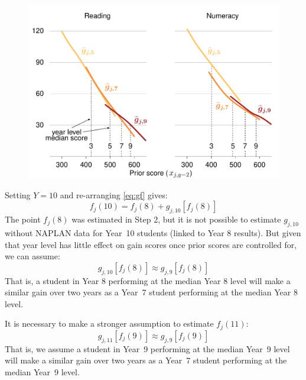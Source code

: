 \begin{figure}[t]
 \includegraphics[width=\columnwidth]{atlas/G579.pdf}\label{fig:g579}

\end{figure}

Setting $Y=10$ and re-arranging \cref{eq:gf} gives:
\begin{equation}
f_{j}\left(10\right) = f_{j}\left(8\right) + g_{j,10}\left[f_{j}\left(8\right)\right]
\end{equation}
The point $f_{j}\left(8\right)$ was estimated in Step 2, but it is not possible to estimate $g_{j,10}$ without NAPLAN data for \mbox{Year 10} students (linked to Year 8 results). But given that year level has little effect on gain scores once prior scores are controlled for, we can assume:
\begin{equation}
g_{j,10}\left[f_{j}\left(8\right)\right] \approx g_{j,9}\left[f_{j}\left(8\right)\right] \label{eq:g9g10}
\end{equation}
That is, a student in Year 8 performing at the median Year 8 level will make a similar gain over two years as a \mbox{Year 7} student performing at the median Year 8 level.

It is necessary to make a stronger assumption to estimate $f_{j}\left(11\right)$: 
\begin{equation}
g_{j,11}\left[f_{j}\left(9\right)\right] \approx g_{j,9}\left[f_{j}\left(9\right)\right] \label{eq:g10g11}
\end{equation}
That is, we assume a student in \mbox{Year 9} performing at the median \mbox{Year 9} level will make a similar gain over two years as a \mbox{Year 7} student performing at the median \mbox{Year 9} level.

